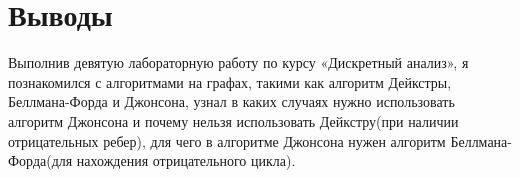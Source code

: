 \section{Выводы}

Выполнив девятую лабораторную работу по курсу «Дискретный анализ», я познакомился с алгоритмами на графах, такими как алгоритм Дейкстры, Беллмана-Форда и
Джонсона, узнал в каких случаях нужно использовать алгоритм Джонсона и почему
нельзя использовать Дейкстру(при наличии отрицательных ребер), для чего в алгоритме Джонсона нужен алгоритм Беллмана-Форда(для нахождения отрицательного
цикла).

\pagebreak
